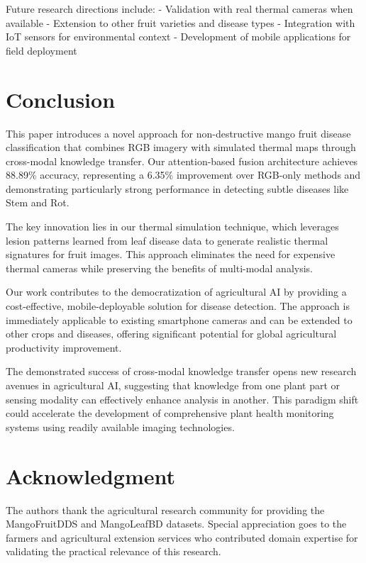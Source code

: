 \documentclass[conference]{IEEEtran}
\begin{document}
Future research directions include:
- Validation with real thermal cameras when available
- Extension to other fruit varieties and disease types
- Integration with IoT sensors for environmental context
- Development of mobile applications for field deployment

\section{Conclusion}

This paper introduces a novel approach for non-destructive mango fruit disease classification that combines RGB imagery with simulated thermal maps through cross-modal knowledge transfer. Our attention-based fusion architecture achieves 88.89\% accuracy, representing a 6.35\% improvement over RGB-only methods and demonstrating particularly strong performance in detecting subtle diseases like Stem and Rot.

The key innovation lies in our thermal simulation technique, which leverages lesion patterns learned from leaf disease data to generate realistic thermal signatures for fruit images. This approach eliminates the need for expensive thermal cameras while preserving the benefits of multi-modal analysis.

Our work contributes to the democratization of agricultural AI by providing a cost-effective, mobile-deployable solution for disease detection. The approach is immediately applicable to existing smartphone cameras and can be extended to other crops and diseases, offering significant potential for global agricultural productivity improvement.

The demonstrated success of cross-modal knowledge transfer opens new research avenues in agricultural AI, suggesting that knowledge from one plant part or sensing modality can effectively enhance analysis in another. This paradigm shift could accelerate the development of comprehensive plant health monitoring systems using readily available imaging technologies.

\section*{Acknowledgment}

The authors thank the agricultural research community for providing the MangoFruitDDS and MangoLeafBD datasets. Special appreciation goes to the farmers and agricultural extension services who contributed domain expertise for validating the practical relevance of this research.
\end{document}
